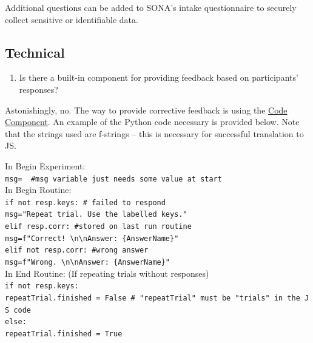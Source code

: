 \documentclass[
]{book}
\providecommand{\tightlist}{%
  \setlength{\itemsep}{0pt}\setlength{\parskip}{0pt}}
\begin{document}
Additional questions can be added to SONA's intake questionnaire to securely collect sensitive or identifiable data.

\hypertarget{technical}{%
\subsection{Technical}\label{technical}}

\begin{enumerate}
\def\labelenumi{(\arabic{enumi})}
\setcounter{enumi}{2}
\tightlist
\item
  Is there a built-in component for providing feedback based on participants' responses?
\end{enumerate}

Astonishingly, no. The way to provide corrective feedback is using the \href{https://www.psychopy.org/builder/components/code.html}{Code Component}. An example of the Python code necessary is provided below. Note that the strings used are f-strings -- this is necessary for successful translation to JS.

In Begin Experiment:\\
\texttt{msg=\textquotesingle{}\textquotesingle{}\ \ \#msg\ variable\ just\ needs\ some\ value\ at\ start}~\\

In Begin Routine:\\
\texttt{if\ not\ resp.keys:\ \#\ failed\ to\ respond}~\\
\hspace*{0.333em} \texttt{msg="Repeat\ trial.\ Use\ the\ labelled\ keys."}\\
\texttt{elif\ resp.corr:\ \#stored\ on\ last\ run\ routine}~\\
\hspace*{0.333em} \texttt{msg=f"Correct!\ \textbackslash{}n\textbackslash{}nAnswer:\ \{AnswerName\}"}\\
\texttt{elif\ not\ resp.corr:\ \#wrong\ answer}~\\
\hspace*{0.333em} \texttt{msg=f"Wrong.\ \textbackslash{}n\textbackslash{}nAnswer:\ \{AnswerName\}"}\\

In End Routine: (If repeating trials without responses)\\
\texttt{if\ not\ resp.keys:}~\\
\hspace*{0.333em} \texttt{repeatTrial.finished\ =\ False\ \#\ "repeatTrial"\ must\ be\ "trials"\ in\ the\ JS\ code}\\
\texttt{else:}~\\
\hspace*{0.333em} \texttt{repeatTrial.finished\ =\ True}\\
~\\
\end{document}
